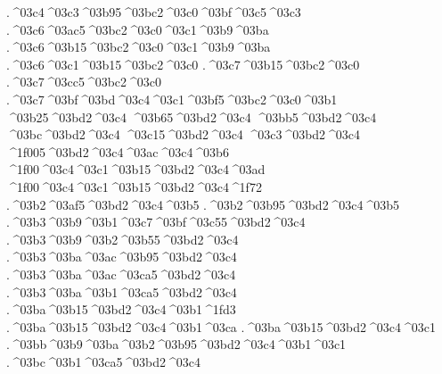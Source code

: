 {.^^^^03c4^^^^03c3^^^^03b95^^^^03bc2^^^^03c0^^^^03bf^^^^03c5^^^^03c3
.^^^^03c6^^^^03ac5^^^^03bc2^^^^03c0^^^^03c1^^^^03b9^^^^03ba  %
.^^^^03c6^^^^03b15^^^^03bc2^^^^03c0^^^^03c1^^^^03b9^^^^03ba
.^^^^03c6^^^^03c1^^^^03b15^^^^03bc2^^^^03c0     %
.^^^^03c7^^^^03b15^^^^03bc2^^^^03c0      %
.^^^^03c7^^^^03cc5^^^^03bc2^^^^03c0     %
.^^^^03c7^^^^03bf^^^^03bd^^^^03c4^^^^03c1^^^^03bf5^^^^03bc2^^^^03c0^^^^03b1 %
^^^^03b25^^^^03bd2^^^^03c4
^^^^03b65^^^^03bd2^^^^03c4
^^^^03bb5^^^^03bd2^^^^03c4
^^^^03bc^^^^03bd2^^^^03c4
^^^^03c15^^^^03bd2^^^^03c4
^^^^03c3^^^^03bd2^^^^03c4
^^^^1f005^^^^03bd2^^^^03c4^^^^03ac^^^^03c4^^^^03b6   %
^^^^1f00^^^^03c4^^^^03c1^^^^03b15^^^^03bd2^^^^03c4^^^^03ad  %
^^^^1f00^^^^03c4^^^^03c1^^^^03b15^^^^03bd2^^^^03c4^^^^1f72
.^^^^03b2^^^^03af5^^^^03bd2^^^^03c4^^^^03b5    %
.^^^^03b2^^^^03b95^^^^03bd2^^^^03c4^^^^03b5
.^^^^03b3^^^^03b9^^^^03b1^^^^03c7^^^^03bf^^^^03c55^^^^03bd2^^^^03c4  %
.^^^^03b3^^^^03b9^^^^03b2^^^^03b55^^^^03bd2^^^^03c4    %
.^^^^03b3^^^^03ba^^^^03ac^^^^03b95^^^^03bd2^^^^03c4   %
.^^^^03b3^^^^03ba^^^^03ac^^^^03ca5^^^^03bd2^^^^03c4
.^^^^03b3^^^^03ba^^^^03b1^^^^03ca5^^^^03bd2^^^^03c4
.^^^^03ba^^^^03b15^^^^03bd2^^^^03c4^^^^03b1^^^^1fd3  %
.^^^^03ba^^^^03b15^^^^03bd2^^^^03c4^^^^03b1^^^^03ca
.^^^^03ba^^^^03b15^^^^03bd2^^^^03c4^^^^03c1     %
.^^^^03bb^^^^03b9^^^^03ba^^^^03b2^^^^03b95^^^^03bd2^^^^03c4^^^^03b1^^^^03c1 %
.^^^^03bc^^^^03b1^^^^03ca5^^^^03bd2^^^^03c4    %
}
